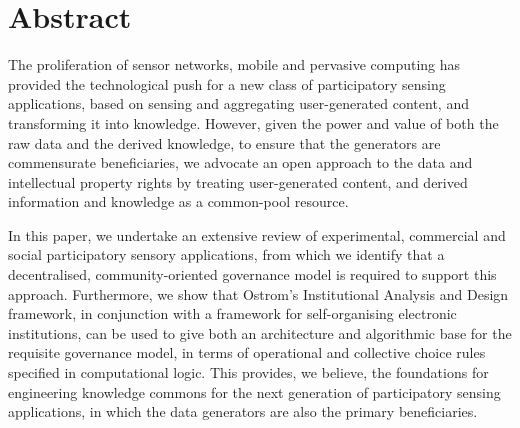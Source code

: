 \begingroup
\let\clearpage\relax
\let\cleardoublepage\relax
\let\cleardoublepage\relax

\chapter*{Abstract}
The proliferation of sensor networks, mobile and pervasive computing has provided the technological push
for a new class of participatory sensing applications, based on sensing and aggregating user-generated
content, and transforming it into knowledge. However, given the power and value of both the raw data
and the derived knowledge, to ensure that the generators are commensurate beneficiaries, we advocate an
open approach to the data and intellectual property rights by treating user-generated content, and derived
information and knowledge as a common-pool resource. 

In this paper, we undertake an extensive review
of experimental, commercial and social participatory sensory applications, from which we identify that a
decentralised, community-oriented governance model is required to support this approach. Furthermore,
we show that Ostrom's Institutional Analysis and Design framework, in conjunction with a framework
for self-organising electronic institutions, can be used to give both an architecture and algorithmic base
for the requisite governance model, in terms of operational and collective choice rules specified in
computational logic. This provides, we believe, the foundations for engineering knowledge commons
for the next generation of participatory sensing applications, in which the data generators are also the
primary beneficiaries.


\endgroup			

\vfill